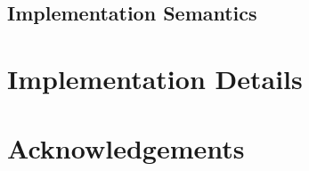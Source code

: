 \documentclass[a4paper,11pt]{article}
\begin{document}
\subsection{Implementation Semantics}

\section{Implementation Details}

\section*{Acknowledgements}



\end{document}
